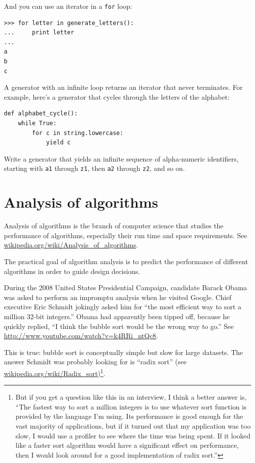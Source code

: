 \documentclass[10pt]{book}
\begin{document}
And you can use an iterator in a {\tt for} loop:

\begin{verbatim}
>>> for letter in generate_letters():
...     print letter
...
a
b
c
\end{verbatim}

A generator with an infinite loop returns an iterator that
never terminates.  For example, here's a generator that
cycles through the letters of the alphabet:

\begin{verbatim}
def alphabet_cycle():
    while True:
        for c in string.lowercase:
            yield c
\end{verbatim}


\begin{ex}

Write a generator that yields an infinite sequence of alpha-numeric
identifiers, starting with {\tt a1} through {\tt z1}, then {\tt a2}
through {\tt z2}, and so on.

\end{ex}


\chapter{Analysis of algorithms}

Analysis of algorithms is the branch of computer science that studies
the performance of algorithms, especially their run time and space
requirements.  See \url{wikipedia.org/wiki/Analysis_of_algorithms}.


The practical goal of algorithm analysis is to predict the performance
of different algorithms in order to guide design decisions.

During the 2008 United States Presidential Campaign, candidate
Barack Obama was asked to perform an impromptu analysis when
he visited Google.  Chief executive Eric Schmidt jokingly asked him
for ``the most efficient way to sort a million 32-bit integers.''
Obama had apparently been tipped off, because he quickly
replied, ``I think the bubble sort would be the wrong way to go.''
See \url{http://www.youtube.com/watch?v=k4RRi_ntQc8}.

This is true: bubble sort is conceptually simple but slow for
large datasets.  The answer Schmidt was probably looking for is
``radix sort'' (see \url{wikipedia.org/wiki/Radix_sort})\footnote{
But if you get a question like this in an interview, I think
a better answer is, ``The fastest way to sort a million integers
is to use whatever sort function is provided by the language
I'm using.  Its performance is good enough for the vast majority
of applications, but if it turned out that my application was too
slow, I would use a profiler to see where the time was being
spent.  If it looked like a faster sort algorithm would have
a significant effect on performance, then I would look
around for a good implementation of radix sort.''}.
\end{document}
